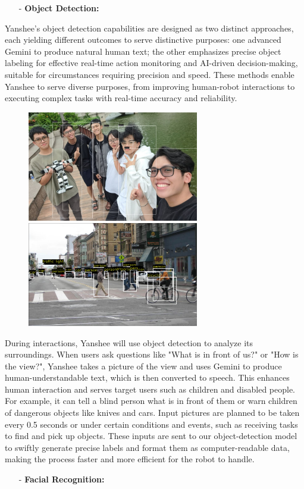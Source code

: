 \documentclass[12pt, a4paper]{article}
\begin{document}
\begin{itemize}
    \item[-] \textbf{Object Detection:}
\end{itemize}

Yanshee's object detection capabilities are designed as two distinct approaches, each yielding different outcomes to serve distinctive purposes: one advanced Gemini to produce natural human text; the other emphasizes precise object labeling for effective real-time action monitoring and AI-driven decision-making, suitable for circumstances requiring precision and speed. These methods enable Yanshee to serve diverse purposes, from improving human-robot interactions to executing complex tasks with real-time accuracy and reliability.
\begin{figure}[h!]
    \centering
    \includegraphics[width=7.5cm]{./image/5.png}
    \qquad
    \includegraphics[width=7.5cm]{./image/2.png}
\end{figure}

During interactions, Yanshee will use object detection to analyze its surroundings. When users ask questions like "What is in front of us?" or "How is the view?", Yanshee takes a picture of the view and uses Gemini to produce human-understandable text, which is then converted to speech. This enhances human interaction and serves target users such as children and disabled people. For example, it can tell a blind person what is in front of them or warn children of dangerous objects like knives and cars. Input pictures are planned to be taken every 0.5 seconds or under certain conditions and events, such as receiving tasks to find and pick up objects. These inputs are sent to our object-detection model to swiftly generate precise labels and format them as computer-readable data, making the process faster and more efficient for the robot to handle.
\begin{itemize}
    \item[-] \textbf{Facial Recognition:}
\end{itemize}
\end{document}
